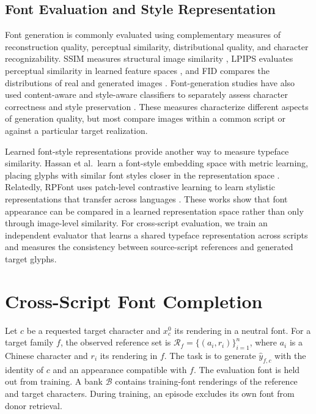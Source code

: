 \documentclass{article}
\newcommand{\Bset}{\mathcal B}
\newcommand{\Rset}{\mathcal R}
\begin{document}
\subsection{Font Evaluation and Style Representation}

Font generation is commonly evaluated using complementary measures of reconstruction quality, perceptual similarity, distributional quality, and character recognizability.
SSIM measures structural image similarity
\citep{wang2004ssim},
LPIPS evaluates perceptual similarity in learned feature spaces
\citep{zhang2018lpips},
and FID compares the distributions of real and generated images
\citep{heusel2017fid}.
Font-generation studies have also used content-aware and style-aware classifiers to separately assess character correctness and style preservation
\citep{park2021lffont}.
These measures characterize different aspects of generation quality, but most compare images within a common script or against a particular target realization.

Learned font-style representations provide another way to measure typeface similarity.
Hassan et al.\ learn a font-style embedding space with metric learning, placing glyphs with similar font styles closer in the representation space
\citep{hassan2024fontstylespace}.
Relatedly, RPFont uses patch-level contrastive learning to learn stylistic representations that transfer across languages
\citep{zeng2026rpfont}.
These works show that font appearance can be compared in a learned representation space rather than only through image-level similarity.
For cross-script evaluation, we train an independent evaluator that learns a shared typeface representation across scripts and measures the consistency between source-script references and generated target glyphs.

\section{Cross-Script Font Completion}
\label{sec:task}
Let $c$ be a requested target character and $x_c^0$ its rendering in a neutral font.
For a target family $f$, the observed reference set is
$\Rset_f=\{(a_i,r_i)\}_{i=1}^{n}$, where $a_i$ is a Chinese character and $r_i$ its rendering in $f$.
The task is to generate $\hat y_{f,c}$ with the identity of $c$ and an appearance compatible with $f$.
The evaluation font is held out from training.
A bank $\Bset$ contains training-font renderings of the reference and target characters.
During training, an episode excludes its own font from donor retrieval.
\end{document}
